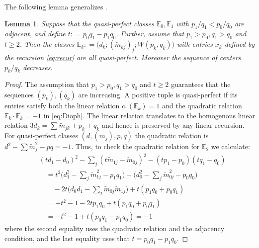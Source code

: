 \documentclass[11pt, reqno]{amsart}
\newtheorem{lemma}[thm]{Lemma}
\theoremstyle{remark}
\numberwithin{equation}{subsection}
\numberwithin{figure}{section}
\theoremstyle{customremark}
\newcommand{\Tm}{{\widetilde m}}
\newcommand{\bE}{{\mathbb E}}
\newcommand{\comm}[1]{\marginpar{\tiny #1 }}
\begin{document}
The following lemma generalizes \cite[Lemma 3.1.4]{MM}.


\begin{lemma}\label{lem:recur} Suppose that the quasi-perfect classes $\bE_0,\bE_1$ with  $p_1/q_1 < p_0/q_0$ are  adjacent, and define
$t : = p_0q_1-p_1q_0$. Further, assume that $p_1>p_0, q_1>q_0$
and $t \geq 2$. Then the classes $\bE_k: =\bigl(d_k; (\Tm_{kj})_j; W(p_k,q_k)\bigr)$ with entries $x_k$ defined by the recursion \eqref{eq:recur} are all quasi-perfect. Moreover the sequence of centers $p_k/q_k$ decreases.
\end{lemma}

\begin{proof} The assumption that  $p_1>p_0, q_1>q_0$ %
and $t \geq 2$ guarantees that the sequences $(p_k), (q_k)$  are increasing. %
A positive tuple is quasi-perfect if its entries satisfy both the linear relation $c_1(\bE_k) = 1$ and the quadratic relation 
$\bE_k\cdot\bE_k = -1$ in \eqref{eq:Dioph}. The linear relation translates to the homogenous linear relation
$3d_k = \sum \Tm_{jk} + p_k + q_k$ and hence is preserved by any linear recursion.  
For quasi-perfect classes $(d,(m_j),p,q)$  the quadratic relation is $d^2 - \sum \Tm_j^2 - pq = -1$. Thus, to check the quadratic relation for $\bE_2$ we calculate:
\begin{align*}
&(td_1-d_0)^2-\sum_j(t\Tm_{1j}-\Tm_{0j})^2-(tp_1-p_0)(tq_1-q_0)\\
&\quad =
t^2\bigl(d_1^2-\sum_j\Tm_{1j}^2-p_1q_1\bigr)
+\bigl(d_0^2-\sum_j\Tm_{0j}^2-p_0q_0\bigr)\\
&\qquad
-2t\bigl(d_0d_1-\sum_j\Tm_{0j}\Tm_{1j}\bigr)
+t(p_1q_0+p_0q_1)\\
&\quad =
-t^2-1-2tp_1q_0+t(p_1q_0+p_0q_1)\\
&\quad =
-t^2-1+t(p_0q_1-p_1q_0)
 = -1
\end{align*}
where the second equality uses the quadratic relation and the adjacency condition, and the last equality uses that $t=p_0q_1-p_1q_0.$

\end{proof}
\end{document}
